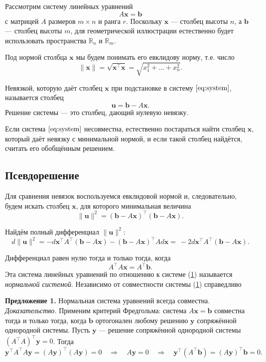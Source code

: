 \documentclass[11pt,a4paper]{article}
\begin{document}
Рассмотрим систему линейных уравнений \[
  A\mathbf{x} = \mathbf{b} \tag{1}\label{eq:system}
\] с матрицей \(A\) размеров \(m \times n\) и ранга \(r\). Поскольку
\(\mathbf{x}\) --- столбец высоты \(n\), а \(\mathbf{b}\) --- столбец
высоты \(m\), для геометрической иллюстрации естественно будет
использовать пространства \(\mathbb{R}_n\) и \(\mathbb{R}_m\).

Под нормой столбца \(\mathbf{x}\) мы будем понимать его евклидову норму,
т.е. число \[
  \|\mathbf{x}\| = \sqrt{\mathbf{x^\top x}} = \sqrt{x_1^2 + \ldots + x_n^2}.
\]

Невязкой, которую даёт столбец \(\mathbf{x}\) при подстановке в систему
\(\eqref{eq:system}\), называется столбец \[
  \mathbf{u} = \mathbf{b} - A\mathbf{x}.
\] Решение системы --- это столбец, дающий нулевую невязку.

Если система \(\eqref{eq:system}\) несовместна, естественно постараться
найти столбец \(\mathbf{x}\), который даёт невязку с минимальной нормой,
и если такой столбец найдётся, считать его обобщённым решением.

    \hypertarget{ux43fux441ux435ux432ux434ux43eux440ux435ux448ux435ux43dux438ux435}{%
\subsection{Псевдорешение}\label{ux43fux441ux435ux432ux434ux43eux440ux435ux448ux435ux43dux438ux435}}

Для сравнения невязок воспользуемся евклидовой нормой и, следовательно,
будем искать столбец \(\mathbf{x}\), для которого минимальная величина
\[
  \|\mathbf{u}\|^2 = (\mathbf{b} - A\mathbf{x})^\top (\mathbf{b} - A \mathbf{x}).
\]

Найдём полный дифференциал \(\|\mathbf{u}\|^2\): \[
  d\|\mathbf{u}\|^2 = -d\mathbf{x}^\top A^\top (\mathbf{b}-A\mathbf{x}) - (\mathbf{b}-A\mathbf{x})^\top A d\mathbf{x} = \
  -2d\mathbf{x}^\top A^\top (\mathbf{b} - A\mathbf{x}).
\]

Дифференциал равен нулю тогда и только тогда, когда \[
  A^\top A \mathbf{x} = A^\top \mathbf{b}.
\] Эта система линейных уравнений по отношению к системе
(\hyperref[mjx-eqn-eqsystem]{1}) называется \emph{нормальной системой}.
Независимо от совместности системы (\hyperref[mjx-eqn-eqsystem]{1})
справедливо

\textbf{Предложение 1.} Нормальная система уравнений всегда совместна.\\
\emph{Доказательство.} Применим критерий Фредгольма: система
\(A\mathbf{x}=\mathbf{b}\) совместна тогда и только тогда, когда
\(\mathbf{b}\) ортогонален любому решению \(\mathbf{y}\) сопряжённой
однородной системы. Пусть \(\mathbf{y}\) --- решение сопряжённой
однородной системы \((A^\top A)^\top \mathbf{y} = 0\). Тогда \[
  \mathbf{y}^\top A^\top A \mathbf{y} = (A \mathbf{y})^\top (A \mathbf{y}) = 0 \quad \Rightarrow \quad
  A \mathbf{y} = 0 \quad \Rightarrow \quad
  \mathbf{y}^\top (A^\top \mathbf{b}) = (A\mathbf{y})^\top \mathbf{b} = 0.
\]
\end{document}

